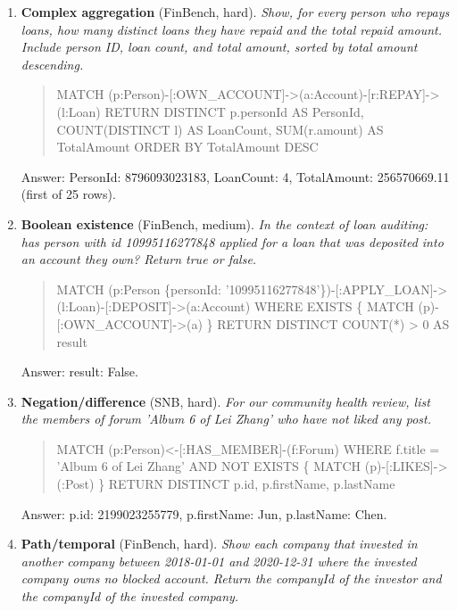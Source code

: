 \begin{enumerate}
\noindent Answer: averageMessageLength: 107.5.
\item \textbf{Complex aggregation} (FinBench, hard). \emph{Show, for every person who repays loans, how many distinct loans they have repaid and the total repaid amount. Include person ID, loan count, and total amount, sorted by total amount descending.}
\begin{quote}\scriptsize\ttfamily\raggedright\sloppy MATCH (p\allowbreak{}:Person)\allowbreak{}-[\allowbreak{}:OWN\_ACCOUNT]\allowbreak{}-\textgreater{}(\allowbreak{}a\allowbreak{}:Account)\allowbreak{}-[r\allowbreak{}:REPAY]\allowbreak{}-\textgreater{}(\allowbreak{}l\allowbreak{}:Loan) RETURN DISTINCT p.personId AS PersonId, COUNT(DISTINCT l) AS LoanCount, SUM(r.amount) AS TotalAmount ORDER BY TotalAmount DESC\end{quote}
\noindent Answer: PersonId: 8796093023183, LoanCount: 4, TotalAmount: 256570669.11 (first of 25 rows).
\item \textbf{Boolean existence} (FinBench, medium). \emph{In the context of loan auditing: has person with id 10995116277848 applied for a loan that was deposited into an account they own? Return true or false.}
\begin{quote}\scriptsize\ttfamily\raggedright\sloppy MATCH (p\allowbreak{}:Person \{personId\allowbreak{}: '10995116277848'\})\allowbreak{}\allowbreak{}-[\allowbreak{}:APPLY\_LOAN]\allowbreak{}-\textgreater{}(\allowbreak{}l\allowbreak{}:Loan)\allowbreak{}-[\allowbreak{}:DEPOSIT]\allowbreak{}-\textgreater{}(\allowbreak{}a\allowbreak{}:Account) WHERE EXISTS \{ MATCH (p)\allowbreak{}-[\allowbreak{}:OWN\_ACCOUNT]\allowbreak{}-\textgreater{}(\allowbreak{}a) \} RETURN DISTINCT COUNT(*) \textgreater{} 0 AS result\end{quote}
\noindent Answer: result: False.
\item \textbf{Negation/difference} (SNB, hard). \emph{For our community health review, list the members of forum 'Album 6 of Lei Zhang' who have not liked any post.}
\begin{quote}\scriptsize\ttfamily\raggedright\sloppy MATCH (p\allowbreak{}:Person)\textless{}-\allowbreak{}[\allowbreak{}:HAS\_MEMBER]\allowbreak{}-(f\allowbreak{}:Forum) WHERE f.title = 'Album 6 of Lei Zhang' AND NOT EXISTS \{ MATCH (p)\allowbreak{}-[\allowbreak{}:LIKES]\allowbreak{}-\textgreater{}(\allowbreak{}\allowbreak{}:Post) \} RETURN DISTINCT p.id, p.firstName, p.lastName\end{quote}
\noindent Answer: p.id: 2199023255779, p.firstName: Jun, p.lastName: Chen.
\item \textbf{Path/temporal} (FinBench, hard). \emph{Show each company that invested in another company between 2018-01-01 and 2020-12-31 where the invested company owns no blocked account. Return the companyId of the investor and the companyId of the invested company.}

\end{enumerate}
